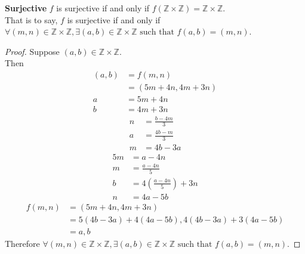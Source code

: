 \documentclass{article}
\begin{document}
\pagebreak

\textbf{Surjective} \(f\) is surjective if and only if \(f(\mathbb{Z} \times \mathbb{Z}) = \mathbb{Z} \times \mathbb{Z}\). \\
That is to say, \(f\) is surjective if and only if \(\forall (m, n) \in \mathbb{Z} \times \mathbb{Z}, \exists (a, b) \in \mathbb{Z} \times \mathbb{Z} \text{ such that } f(a, b) = (m, n)\).
\begin{proof}
    Suppose \((a, b) \in \mathbb{Z} \times \mathbb{Z}\). \\
    Then
    \begin{align*}
        (a, b) & = f(m, n)            \\
               & = (5m + 4n, 4m + 3n) \\
        a      & = 5m + 4n            \\
        b      & = 4m + 3n
    \end{align*}
    \begin{align*}
        n & = \frac{b - 4m}{3} \\
        a & = \frac{4b-m}{3}   \\
        m & = 4b - 3a
    \end{align*}
    \begin{align*}
        5m & = a - 4n                 \\
        m  & = \frac{a-4n}{5}         \\
        b  & = 4(\frac{a-4n}{5}) + 3n \\
        n  & = 4a - 5b
    \end{align*}
    \begin{align*}
        f(m, n) & = (5m + 4n, 4m + 3n)                         \\
                & = 5(4b-3a) + 4(4a - 5b), 4(4b-3a) + 3(4a-5b) \\
                & = a, b
    \end{align*}
    Therefore \(\forall (m, n) \in \mathbb{Z} \times \mathbb{Z}, \exists (a, b) \in \mathbb{Z} \times \mathbb{Z} \text{ such that } f(a, b) = (m, n)\).
\end{proof}
\end{document}
